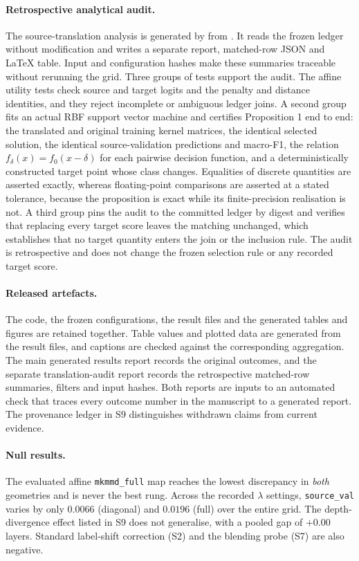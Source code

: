\documentclass[a4paper,fleqn]{cas-dc}
\begin{document}
\paragraph{Retrospective analytical audit.} The source-translation analysis is
generated by  from
. It reads the frozen ledger without
modification and writes a separate report, matched-row JSON and LaTeX table.
Input and configuration hashes make these summaries traceable without
rerunning the grid. Three groups of tests support the audit. The affine utility
tests check source and target logits and the penalty and distance identities,
and they reject incomplete or ambiguous ledger joins. A second group fits an
actual RBF support vector machine and certifies Proposition 1 end to end: the
translated and original training kernel matrices, the identical selected
solution, the identical source-validation predictions and macro-F1, the
relation $f_\delta(x)=f_0(x-\delta)$ for each pairwise decision function, and a
deterministically constructed target point whose class changes. Equalities of
discrete quantities are asserted exactly, whereas floating-point comparisons
are asserted at a stated tolerance, because the proposition is exact while its
finite-precision realisation is not. A third group pins the audit to the
committed ledger by digest and verifies that replacing every target score
leaves the matching unchanged, which establishes that no target quantity
enters the join or the inclusion rule. The audit is retrospective and does not
change the frozen selection rule or any recorded target score.

\paragraph{Released artefacts.} The code, the frozen configurations, the result
files and the generated tables and figures are retained together. Table values
and plotted data are generated from the result files, and captions are checked
against the corresponding aggregation. The main generated results report
records the original outcomes, and the separate translation-audit report
records the retrospective matched-row summaries, filters and input hashes.
Both reports are inputs to an automated check that traces every outcome number
in the manuscript to a generated report. The provenance ledger in S9
distinguishes withdrawn claims from current evidence.

\paragraph{Null results.} The evaluated affine \texttt{mkmmd\_full} map reaches
the lowest discrepancy in \emph{both} geometries and is never the best rung.
Across the recorded $\lambda$ settings, \texttt{source\_val} varies by only
$0.0066$ (diagonal) and $0.0196$ (full) over the entire grid. The
depth-divergence effect listed in S9 does not generalise, with a pooled gap of
$+0.00$ layers. Standard label-shift correction (S2) and the blending probe
(S7) are also negative.



\end{document}
